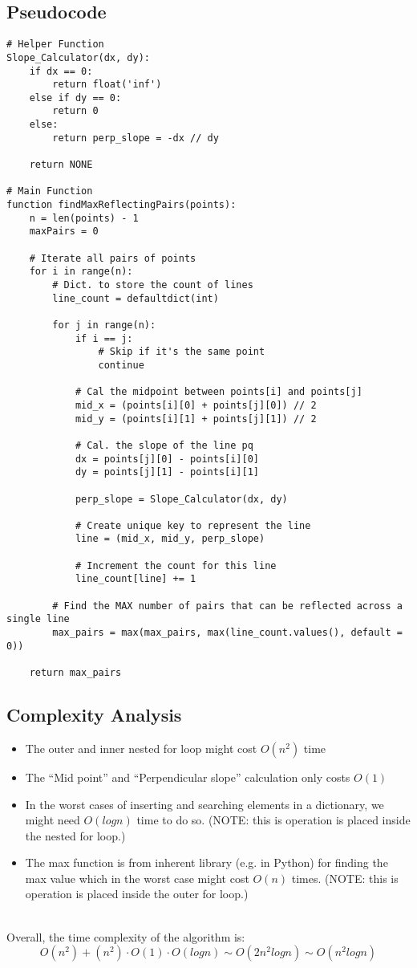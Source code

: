 \documentclass{article}
\begin{document}
\subsection*{Pseudocode}
\begin{verbatim}
# Helper Function
Slope_Calculator(dx, dy):
    if dx == 0:
        return float('inf')
    else if dy == 0:
        return 0
    else:
        return perp_slope = -dx // dy

    return NONE

# Main Function
function findMaxReflectingPairs(points):
    n = len(points) - 1
    maxPairs = 0

    # Iterate all pairs of points
    for i in range(n):
        # Dict. to store the count of lines
        line_count = defaultdict(int)

        for j in range(n):
            if i == j:
                # Skip if it's the same point
                continue 

            # Cal the midpoint between points[i] and points[j]
            mid_x = (points[i][0] + points[j][0]) // 2
            mid_y = (points[i][1] + points[j][1]) // 2

            # Cal. the slope of the line pq
            dx = points[j][0] - points[i][0]
            dy = points[j][1] - points[i][1]

            perp_slope = Slope_Calculator(dx, dy)

            # Create unique key to represent the line
            line = (mid_x, mid_y, perp_slope)

            # Increment the count for this line
            line_count[line] += 1

        # Find the MAX number of pairs that can be reflected across a single line
        max_pairs = max(max_pairs, max(line_count.values(), default = 0))

    return max_pairs

\end{verbatim}

\subsection*{Complexity Analysis}
\begin{itemize}
    \item The outer and inner nested for loop might cost $O(n^2)$ time 
    \item The ``Mid point'' and ``Perpendicular slope'' calculation only costs $O(1)$ 
    \item In the worst cases of inserting and searching elements in a dictionary, we might need $O(logn)$ time to do so. (NOTE: this is operation is placed inside the nested for loop.)
    \item The max function is from inherent library (e.g. in Python) for finding the max value which in the worst case might cost $O(n)$ times. (NOTE: this is operation is placed inside the outer for loop.)
\end{itemize}
\\
Overall, the time complexity of the algorithm is:
\[ O(n^2) + (n^2) \cdot O(1) \cdot O(logn) \sim O(2n^2logn) \sim O(n^2logn) \]
\end{document}
